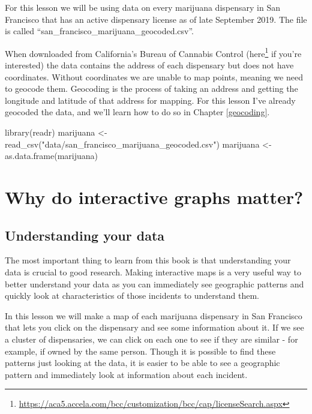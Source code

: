 \documentclass[
]{krantz}
\makeatletter
\newenvironment{Shaded}{\begin{snugshade}}{\end{snugshade}}
\newcommand{\FunctionTok}[1]{\textcolor[rgb]{0,0,0}{#1}}
\newcommand{\NormalTok}[1]{#1}
\newcommand{\OtherTok}[1]{\textcolor[rgb]{0.37,0.37,0.37}{#1}}
\newcommand{\StringTok}[1]{\textcolor[rgb]{0.5,0.5,0.5}{#1}}
\renewcommand{\href}[2]{#2\footnote{\url{#1}}}
\newenvironment{kframe}{%
\medskip{}
\setlength{\fboxsep}{.8em}
 \def\at@end@of@kframe{}%
 \ifinner\ifhmode%
  \def\at@end@of@kframe{\end{minipage}}%
  \begin{minipage}{\columnwidth}%
 \fi\fi%
 \def\FrameCommand##1{\hskip\@totalleftmargin \hskip-\fboxsep
 \colorbox{shadecolor}{##1}\hskip-\fboxsep
     \hskip-\linewidth \hskip-\@totalleftmargin \hskip\columnwidth}%
 \MakeFramed {\advance\hsize-\width
   \@totalleftmargin\z@ \linewidth\hsize
   \@setminipage}}%
 {\par\unskip\endMakeFramed%
 \at@end@of@kframe}
\renewenvironment{Shaded}{\begin{kframe}}{\end{kframe}}
\makeatother
\begin{document}
For this lesson we will be using data on every marijuana
dispensary in San Francisco that has an active dispensary
license as of late September 2019. The file is called
``san\_francisco\_marijuana\_geocoded.csv''.

When downloaded from California's Bureau of Cannabis Control
(\href{https://aca5.accela.com/bcc/customization/bcc/cap/licenseSearch.aspx}{here}
if you're interested) the data contains the address of each
dispensary but does not have coordinates. Without
coordinates we are unable to map points, meaning we need to
geocode them. Geocoding is the process of taking an address
and getting the longitude and latitude of that address for
mapping. For this lesson I've already geocoded the data, and
we'll learn how to do so in Chapter \ref{geocoding}.

\begin{Shaded}
\begin{Highlighting}[]
\FunctionTok{library}\NormalTok{(readr)}
\NormalTok{marijuana }\OtherTok{\textless{}{-}} \FunctionTok{read\_csv}\NormalTok{(}\StringTok{"data/san\_francisco\_marijuana\_geocoded.csv"}\NormalTok{)}
\NormalTok{marijuana }\OtherTok{\textless{}{-}} \FunctionTok{as.data.frame}\NormalTok{(marijuana)}
\end{Highlighting}
\end{Shaded}

\hypertarget{why-do-interactive-graphs-matter}{%
\section{Why do interactive graphs
matter?}\label{why-do-interactive-graphs-matter}}

\hypertarget{understanding-your-data}{%
\subsection{Understanding your
data}\label{understanding-your-data}}

The most important thing to learn from this book is that
understanding your data is crucial to good research. Making
interactive maps is a very useful way to better understand
your data as you can immediately see geographic patterns and
quickly look at characteristics of those incidents to
understand them.

In this lesson we will make a map of each marijuana
dispensary in San Francisco that lets you click on the
dispensary and see some information about it. If we see a
cluster of dispensaries, we can click on each one to see if
they are similar - for example, if owned by the same person.
Though it is possible to find these patterns just looking at
the data, it is easier to be able to see a geographic
pattern and immediately look at information about each
incident.
\end{document}

